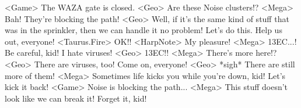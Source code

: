 <Game> The WAZA gate is closed. 
<Geo> Are these Noise clusters!? 
<Mega> Bah! They're blocking the path! 
<Geo> Well, if it's the same kind of stuff that was in the 
sprinkler, then we can handle it no problem! 
Let's do this. Help us out, everyone! 
<Taurus.Fire> OK!! 
<HarpNote> My pleasure! 
<Mega> {13}{EC}...! 
Be careful, kid! I hate viruses! 
<Geo> {13}{EC}!! 
<Mega> There's more here!? 
<Geo> There are viruses, too! 
Come on, everyone! 
<Geo> *sigh* There are still more of them! 
<Mega> Sometimes life kicks you while you're down, kid! 
Let's kick it back! 
<Game> Noise is blocking the path... 
<Mega> This stuff doesn't look like we can break it! Forget it, kid! 
